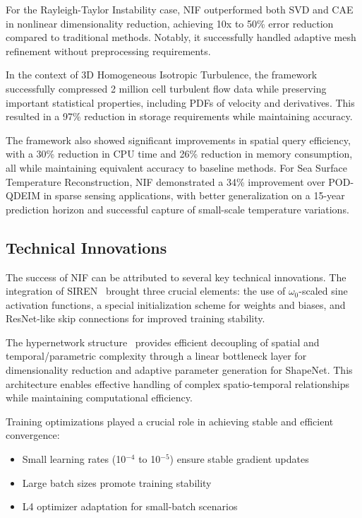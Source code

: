 \documentclass[10pt,journal,compsoc,onecolumn]{IEEEtran}
\begin{document}
For the Rayleigh-Taylor Instability case, NIF outperformed both SVD and CAE in nonlinear dimensionality reduction, achieving 10x to 50\% error reduction compared to traditional methods. Notably, it successfully handled adaptive mesh refinement without preprocessing requirements.

In the context of 3D Homogeneous Isotropic Turbulence, the framework successfully compressed 2 million cell turbulent flow data while preserving important statistical properties, including PDFs of velocity and derivatives. This resulted in a 97\% reduction in storage requirements while maintaining accuracy.

The framework also showed significant improvements in spatial query efficiency, with a 30\% reduction in CPU time and 26\% reduction in memory consumption, all while maintaining equivalent accuracy to baseline methods. For Sea Surface Temperature Reconstruction, NIF demonstrated a 34\% improvement over POD-QDEIM in sparse sensing applications, with better generalization on a 15-year prediction horizon and successful capture of small-scale temperature variations.

\subsection{Technical Innovations}
The success of NIF can be attributed to several key technical innovations. The integration of SIREN~\cite{siren2020} brought three crucial elements: the use of $\omega_0$-scaled sine activation functions, a special initialization scheme for weights and biases, and ResNet-like skip connections for improved training stability.

The hypernetwork structure~\cite{hypernetworks2016} provides efficient decoupling of spatial and temporal/parametric complexity through a linear bottleneck layer for dimensionality reduction and adaptive parameter generation for ShapeNet. This architecture enables effective handling of complex spatio-temporal relationships while maintaining computational efficiency.

Training optimizations played a crucial role in achieving stable and efficient convergence:

\begin{itemize}
    \item Small learning rates (10$^{-4}$ to 10$^{-5}$) ensure stable gradient updates
    \item Large batch sizes promote training stability
    \item L4 optimizer adaptation for small-batch scenarios
\end{itemize}
\end{document}
